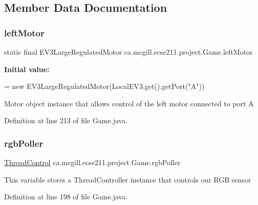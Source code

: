 \subsection{Member Data Documentation}
\mbox{\label{enumca_1_1mcgill_1_1ecse211_1_1project_1_1_game_a7c673571bf50fdb6917a9d7bb671e003}} 
\subsubsection{\texorpdfstring{left\+Motor}{leftMotor}}
{\footnotesize\ttfamily  static  final E\+V3\+Large\+Regulated\+Motor ca.\+mcgill.\+ecse211.\+project.\+Game.\+left\+Motor\hspace{0.3cm}{\ttfamily [static]}}

{\bfseries Initial value\+:}
\begin{DoxyCode}
=
      \textcolor{keyword}{new} EV3LargeRegulatedMotor(LocalEV3.get().getPort(\textcolor{stringliteral}{"A"}))
\end{DoxyCode}
Motor object instance that allows control of the left motor connected to port A 

Definition at line 213 of file Game.\+java.

\mbox{\label{enumca_1_1mcgill_1_1ecse211_1_1project_1_1_game_af24a953a0c3438670220dde36c532b5d}} 
\subsubsection{\texorpdfstring{rgb\+Poller}{rgbPoller}}
{\footnotesize\ttfamily \hyperlink{classca_1_1mcgill_1_1ecse211_1_1threads_1_1_thread_control}{Thread\+Control} ca.\+mcgill.\+ecse211.\+project.\+Game.\+rgb\+Poller}

This variable stores a Thread\+Controller instance that controls our R\+GB sensor 

Definition at line 198 of file Game.\+java.

